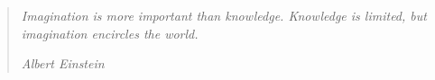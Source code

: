 \documentclass[../Main/thesis.tex]{subfiles}
\begin{document}
\chapter*{}
\null\vfill
\begin{quotation}
\em %
Imagination is more important than knowledge. Knowledge is limited, but imagination encircles the world.

\em
\medskip
\raggedleft
Albert Einstein
\end{quotation}
\vfill\vfill
\end{document}
